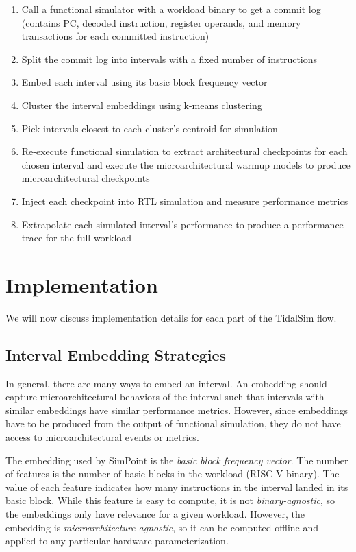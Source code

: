 \documentclass[sigplan,nonacm,10pt]{acmart}
\begin{document}
\begin{enumerate}
  \item Call a functional simulator with a workload binary to get a commit log (contains PC, decoded instruction, register operands, and memory transactions for each committed instruction)
  \item Split the commit log into intervals with a fixed number of instructions
  \item Embed each interval using its basic block frequency vector
  \item Cluster the interval embeddings using k-means clustering
  \item Pick intervals closest to each cluster's centroid for simulation
  \item Re-execute functional simulation to extract architectural checkpoints for each chosen interval and execute the microarchitectural warmup models to produce microarchitectural checkpoints
  \item Inject each checkpoint into RTL simulation and measure performance metrics
  \item Extrapolate each simulated interval's performance to produce a performance trace for the full workload
\end{enumerate}

\section{Implementation}

We will now discuss implementation details for each part of the TidalSim flow.

\subsection{Interval Embedding Strategies}

In general, there are many ways to embed an interval.
An embedding should capture microarchitectural behaviors of the interval such that intervals with similar embeddings have similar performance metrics.
However, since embeddings have to be produced from the output of functional simulation, they do not have access to microarchitectural events or metrics.

The embedding used by SimPoint is the \textit{basic block frequency vector}.
The number of features is the number of basic blocks in the workload (RISC-V binary).
The value of each feature indicates how many instructions in the interval landed in its basic block.
While this feature is easy to compute, it is not \textit{binary-agnostic}, so the embeddings only have relevance for a given workload.
However, the embedding is \textit{microarchitecture-agnostic}, so it can be computed offline and applied to any particular hardware parameterization.
\end{document}
